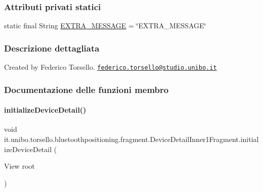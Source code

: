 \subsubsection*{Attributi privati statici}
\begin{DoxyCompactItemize}
\item 
static final String \hyperlink{classit_1_1unibo_1_1torsello_1_1bluetoothpositioning_1_1fragment_1_1DeviceDetailInner1Fragment_ac0b0104608454a0d84a47ad82ef186fc_ac0b0104608454a0d84a47ad82ef186fc}{E\+X\+T\+R\+A\+\_\+\+M\+E\+S\+S\+A\+GE} = \char`\"{}E\+X\+T\+R\+A\+\_\+\+M\+E\+S\+S\+A\+GE\char`\"{}
\end{DoxyCompactItemize}


\subsubsection{Descrizione dettagliata}
Created by Federico Torsello. \href{mailto:federico.torsello@studio.unibo.it}{\tt federico.\+torsello@studio.\+unibo.\+it} 

\subsubsection{Documentazione delle funzioni membro}
\hypertarget{classit_1_1unibo_1_1torsello_1_1bluetoothpositioning_1_1fragment_1_1DeviceDetailInner1Fragment_a1d1f9def45a374e0fd22bf443ff609a4_a1d1f9def45a374e0fd22bf443ff609a4}{}\label{classit_1_1unibo_1_1torsello_1_1bluetoothpositioning_1_1fragment_1_1DeviceDetailInner1Fragment_a1d1f9def45a374e0fd22bf443ff609a4_a1d1f9def45a374e0fd22bf443ff609a4} 
\paragraph{\texorpdfstring{initialize\+Device\+Detail()}{initializeDeviceDetail()}}
{\footnotesize\ttfamily void it.\+unibo.\+torsello.\+bluetoothpositioning.\+fragment.\+Device\+Detail\+Inner1\+Fragment.\+initialize\+Device\+Detail (\begin{DoxyParamCaption}\item[{View}]{root }\end{DoxyParamCaption})\hspace{0.3cm}{\ttfamily [private]}}


